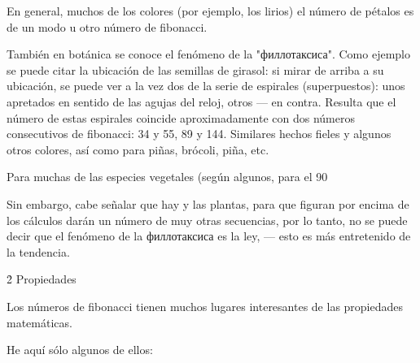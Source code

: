 En general, muchos de los colores (por ejemplo, los lirios) el número de pétalos es de un modo u otro número de fibonacci.

También en botánica se conoce el fenómeno de la "филлотаксиса". Como ejemplo se puede citar la ubicación de las semillas de girasol: si mirar de arriba a su ubicación, se puede ver a la vez dos de la serie de espirales (superpuestos): unos apretados en sentido de las agujas del reloj, otros --- en contra. Resulta que el número de estas espirales coincide aproximadamente con dos números consecutivos de fibonacci: 34 y 55, 89 y 144. Similares hechos fieles y algunos otros colores, así como para piñas, brócoli, piña, etc.

Para muchas de las especies vegetales (según algunos, para el 90%

Sin embargo, cabe señalar que hay y las plantas, para que figuran por encima de los cálculos darán un número de muy otras secuencias, por lo tanto, no se puede decir que el fenómeno de la филлотаксиса es la ley, --- esto es más entretenido de la tendencia.


\h2{ Propiedades }

Los números de fibonacci tienen muchos lugares interesantes de las propiedades matemáticas.

He aquí sólo algunos de ellos:

